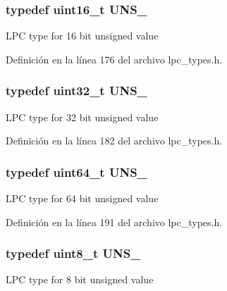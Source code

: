 \subsubsection[{\texorpdfstring{U\+N\+S\+\_\+16}{UNS_16}}]{\setlength{\rightskip}{0pt plus 5cm}typedef uint16\+\_\+t {\bf U\+N\+S\+\_}}\hypertarget{group___l_p_c___types___public___types_gafce87a7f2271b2cf38d7532f157f8a50}{}\label{group___l_p_c___types___public___types_gafce87a7f2271b2cf38d7532f157f8a50}
L\+PC type for 16 bit unsigned value 

Definición en la línea 176 del archivo lpc\+\_\+types.\+h.

\subsubsection[{\texorpdfstring{U\+N\+S\+\_\+32}{UNS_32}}]{\setlength{\rightskip}{0pt plus 5cm}typedef uint32\+\_\+t {\bf U\+N\+S\+\_}}\hypertarget{group___l_p_c___types___public___types_ga28adf5c6b1811ca447826319598d8aba}{}\label{group___l_p_c___types___public___types_ga28adf5c6b1811ca447826319598d8aba}
L\+PC type for 32 bit unsigned value 

Definición en la línea 182 del archivo lpc\+\_\+types.\+h.

\subsubsection[{\texorpdfstring{U\+N\+S\+\_\+64}{UNS_64}}]{\setlength{\rightskip}{0pt plus 5cm}typedef uint64\+\_\+t {\bf U\+N\+S\+\_}}\hypertarget{group___l_p_c___types___public___types_ga2299199b92f0535ad8c2e2d8c7c7f09b}{}\label{group___l_p_c___types___public___types_ga2299199b92f0535ad8c2e2d8c7c7f09b}
L\+PC type for 64 bit unsigned value 

Definición en la línea 191 del archivo lpc\+\_\+types.\+h.

\subsubsection[{\texorpdfstring{U\+N\+S\+\_\+8}{UNS_8}}]{\setlength{\rightskip}{0pt plus 5cm}typedef uint8\+\_\+t {\bf U\+N\+S\+\_}}\hypertarget{group___l_p_c___types___public___types_ga7353117656180c64d2216c874998b98b}{}\label{group___l_p_c___types___public___types_ga7353117656180c64d2216c874998b98b}
L\+PC type for 8 bit unsigned value 

